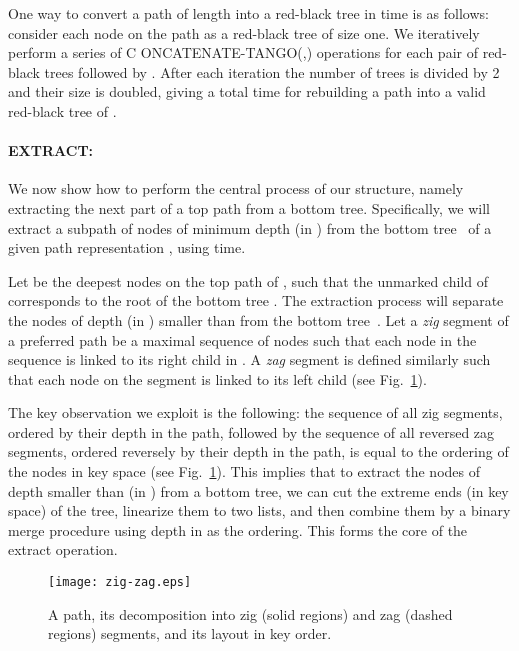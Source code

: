 \documentclass[letterpaper,11pt]{article}
\newcommand{\toppath}{top path}
\newcommand{\bottomtree}{bottom tree}
\begin{document}
One way to convert a path of length  into a red-black tree in 
time is as follows: consider each node on the path as a red-black tree of
size one. We iteratively perform a series of C{\scriptsize
ONCATENATE}-T{\scriptsize ANGO}(,) operations for each pair of
red-black trees  followed by . After each iteration the number of
trees is divided by 2 and their size is doubled, giving a total time for
rebuilding a path into a valid red-black tree of .

\paragraph{EXTRACT:}



We now show how to perform the central process of our structure, namely
extracting the next part of a \toppath{} from a
\bottomtree{}. Specifically, we will extract a subpath of 
nodes of minimum depth (in ) from the \bottomtree{}~ of a given path
representation , using  time.


Let  be the deepest nodes on the \toppath{} of , such that the
unmarked child of  corresponds to the root of the \bottomtree{}
. The extraction process will separate the nodes of depth (in )
smaller than  from the \bottomtree{}~.
Let a \emph{zig} segment of a preferred path  be a maximal sequence of
nodes such that each node in the sequence is linked to its right child in
. A \emph{zag} segment is defined similarly such that each node on the
segment is linked to its left child (see Fig.~\ref{fig-zig-zag}).

The key observation we exploit is the following: the sequence of all zig
segments, ordered by their depth in the path, followed by the sequence of
all reversed zag segments, ordered reversely by their depth in the path, is
equal to the ordering of the nodes in key space (see
Fig.~\ref{fig-zig-zag}).
This implies that to extract the nodes of depth smaller than  (in )
from a \bottomtree{}, we can cut the extreme ends (in key space) of the
tree, linearize them to two lists, and then combine them by a binary merge
procedure using depth in  as the ordering. This forms the core of the
extract operation.

\begin{figure}\begin{center}
        \texttt{[image: zig-zag.eps]}
    \end{center}
    \caption{\label{fig-zig-zag} A path, its decomposition into zig (solid
    regions) and zag (dashed regions) segments, and its layout in key order.}
\end{figure}
\end{document}
